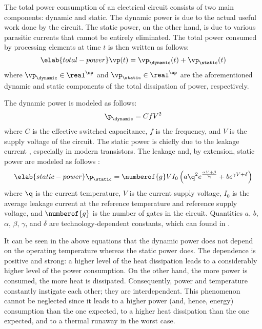 The total power consumption of an electrical circuit consists of two main
components: dynamic and static. The dynamic power is due to the actual useful
work done by the circuit. The static power, on the other hand, is due to various
parasitic currents that cannot be entirely eliminated. The total power consumed
by \np processing elements at time $t$ is then written as follows:
\begin{equation} \elab{total-power}
  \vp(t) = \vp_\dynamic(t) + \vp_\static(t)
\end{equation}
where $\vp_\dynamic \in \real^\np$ and $\vp_\static \in \real^\np$ are the
aforementioned dynamic and static components of the total dissipation of power,
respectively.

The dynamic power is modeled as follows:
\[
  \p_\dynamic = C f V^2
\]
where $C$ is the effective switched capacitance, $f$ is the frequency, and $V$
is the supply voltage of the circuit. The static power is chiefly due to the
leakage current \cite{chandrakasan2000, srivastava2010, juan2011, juan2012},
especially in modern  transistors. The leakage and, by extension,
static power are modeled as follows \cite{liao2005}:
\begin{equation} \elab{static-power}
  \p_\static = \numberof{g} V I_0 \left(a \q^2 e^{\frac{\alpha V + \beta}{\q}} + b e^{\gamma V + \delta}\right)
\end{equation}
where $\q$ is the current temperature, $V$ is the current supply voltage, $I_0$
is the average leakage current at the reference temperature and reference supply
voltage, and $\numberof{g}$ is the number of gates in the circuit. Quantities
$a$, $b$, $\alpha$, $\beta$, $\gamma$, and $\delta$ are technology-dependent
constants, which can found in \cite{liao2005}.

It can be seen in the above equations that the dynamic power does not depend on
the operating temperature whereas the static power does. The dependence is
positive and strong: a higher level of the heat dissipation leads to a
considerably higher level of the power consumption. On the other hand, the more
power is consumed, the more heat is dissipated. Consequently, power and
temperature constantly instigate each other; they are interdependent. This
phenomenon cannot be neglected since it leads to a higher power (and, hence,
energy) consumption than the one expected, to a higher heat dissipation than the
one expected, and to a thermal runaway in the worst case.
